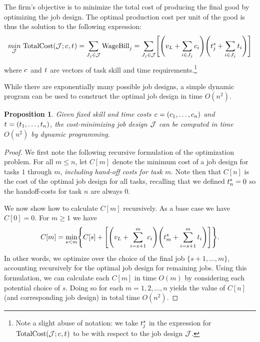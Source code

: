 \documentclass{article}
\theoremstyle{plain}
\theoremstyle{plain}
\newtheorem{proposition}{Proposition}
\begin{document}
The firm's objective is to minimize the total cost of producing the final good by optimizing the job design.  The optimal production cost per unit of the good is thus the solution to the following expression:
\begin{align}
\label{eq:totalcost_with_handoff}
\underset{\J}{min} \ 
\text{TotalCost}(\J; \hccost{}, \timecost{}) 
= \sum_{J_j \in \J} \text{WageBill}_j = 
\sum_{J_j \in \J} \Biggl[\Biggl(v_L + \sum_{i \in J_j} \hccost{i} \Biggr) \Biggl(\handofftime{j} + \sum_{i \in J_j} \timecost{i} \Biggr)\Biggr]
\end{align}
where $c_{}$ and $t_{}$ are vectors of task skill and time requirements.\footnote{Note a slight abuse of notation: we take $t^{s}_{j}$ in the expression for $\text{TotalCost}(\mathcal{J}; c_{}, t_{})$ to be with respect to the job design $\mathcal{J}$.}


While there are exponentially many possible job designs, a simple dynamic program can be used to construct the optimal job design in time $O(n^2)$.

\begin{proposition}
    Given fixed skill and time costs $c_{} = (c_{1}, \dotsc, c_{n})$ and $t_{} = (t_{1}, \dotsc, t_{n})$, the cost-minimizing job design $\mathcal{J}$ can be computed in time $O(n^2)$ by dynamic programming.
\end{proposition}
\begin{proof}
    We first note the following recursive formulation of the optimization problem. For all $m \leq n$, let $C[m]$ denote the minimum cost of a job design for tasks $1$ through $m$, \emph{including hand-off costs for task $m$}.  Note then that $C[n]$ is the cost of the optimal job design for all tasks, recalling that we defined $t^{s}_{n} = 0$ so the handoff-costs for task $n$ are always $0$.
    
    We now show how to calculate $C[m]$ recursively.  As a base case we have $C[0] = 0$.  For $m \geq 1$ we have
    \[ 
    C[m] = \min_{s < m} \Biggl\{ C[s] + \Biggl[\Biggl(v_L + \sum_{i = s+1}^m c_{i} \Biggr) \Biggl(t^{s}_{m} + \sum_{i = s+1}^m t_{i} \Biggr)\Biggr] \Biggr\}.
    \]
    In other words, we optimize over the choice of the final job $\{s+1, \dotsc, m\}$, accounting recursively for the optimal job design for remaining jobs.  Using this formulation, we can calculate each $C[m]$ in time $O(m)$ by considering each potential choice of $s$.  Doing so for each $m = 1, 2, \dotsc, n$ yields the value of $C[n]$ (and corresponding job design) in total time $O(n^2)$.
\end{proof}
\end{document}
